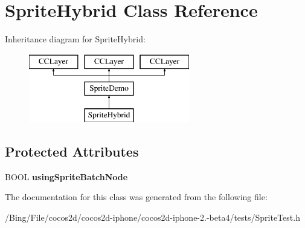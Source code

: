 \hypertarget{interface_sprite_hybrid}{\section{Sprite\-Hybrid Class Reference}
\label{interface_sprite_hybrid}
}
Inheritance diagram for Sprite\-Hybrid\-:\begin{figure}[H]
\begin{center}
\leavevmode
\includegraphics[height=3.000000cm]{interface_sprite_hybrid}
\end{center}
\end{figure}
\subsection*{Protected Attributes}
\begin{DoxyCompactItemize}
\item 
\hypertarget{interface_sprite_hybrid_ac19ffb08394e370a6eff775b8129d4cd}{B\-O\-O\-L {\bfseries using\-Sprite\-Batch\-Node}}\label{interface_sprite_hybrid_ac19ffb08394e370a6eff775b8129d4cd}

\end{DoxyCompactItemize}


The documentation for this class was generated from the following file\-:\begin{DoxyCompactItemize}
\item 
/\-Bing/\-File/cocos2d/cocos2d-\/iphone/cocos2d-\/iphone-\/2.-\/beta4/tests/Sprite\-Test.\-h\end{DoxyCompactItemize}
